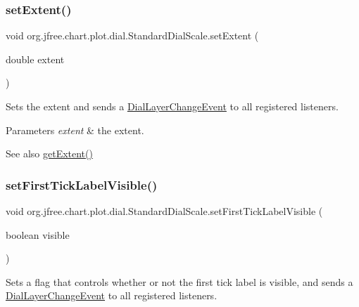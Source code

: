 \subsubsection{\texorpdfstring{set\+Extent()}{setExtent()}}
{\footnotesize\ttfamily void org.\+jfree.\+chart.\+plot.\+dial.\+Standard\+Dial\+Scale.\+set\+Extent (\begin{DoxyParamCaption}\item[{double}]{extent }\end{DoxyParamCaption})}

Sets the extent and sends a \mbox{\hyperlink{classorg_1_1jfree_1_1chart_1_1plot_1_1dial_1_1_dial_layer_change_event}{Dial\+Layer\+Change\+Event}} to all registered listeners.


\begin{DoxyParams}{Parameters}
{\em extent} & the extent.\\
\hline
\end{DoxyParams}
\begin{DoxySeeAlso}{See also}
\mbox{\hyperlink{classorg_1_1jfree_1_1chart_1_1plot_1_1dial_1_1_standard_dial_scale_a7be4f1dfca3997ea1ed3ff965ebdc820}{get\+Extent()}} 
\end{DoxySeeAlso}
\mbox{\label{classorg_1_1jfree_1_1chart_1_1plot_1_1dial_1_1_standard_dial_scale_a7dbb7bf5160437cccc534abe2ec96353}} 
\subsubsection{\texorpdfstring{set\+First\+Tick\+Label\+Visible()}{setFirstTickLabelVisible()}}
{\footnotesize\ttfamily void org.\+jfree.\+chart.\+plot.\+dial.\+Standard\+Dial\+Scale.\+set\+First\+Tick\+Label\+Visible (\begin{DoxyParamCaption}\item[{boolean}]{visible }\end{DoxyParamCaption})}

Sets a flag that controls whether or not the first tick label is visible, and sends a \mbox{\hyperlink{classorg_1_1jfree_1_1chart_1_1plot_1_1dial_1_1_dial_layer_change_event}{Dial\+Layer\+Change\+Event}} to all registered listeners.


